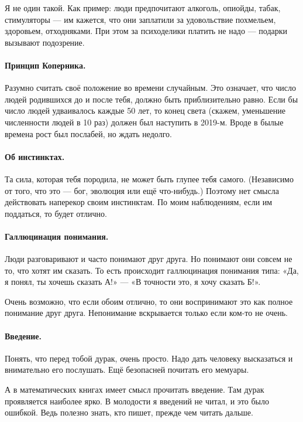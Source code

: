 \documentclass{book}
\begin{document}
Я не один такой.
Как пример: люди предпочитают алкоголь, опиойды, табак, стимуляторы --- им кажется, что они заплатили за удовольствие похмельем, здоровьем, отходняками.
При этом за психоделики платить не надо --- подарки вызывают подозрение.

\paragraph{Принцип Коперника.}
Разумно считать своё положение во времени случайным.
Это означает, что число людей родившихся до и после тебя, должно быть приблизительно равно.
Если бы число людей удваивалось каждые 50 лет, то конец света (скажем, уменьшение численности людей в 10 раз) должен был наступить в 2019-м.
Вроде в былые времена рост был послабей, но ждать недолго.

\paragraph{Об инстинктах.}
Та сила, которая тебя породила, не может быть глупее тебя самого.
(Независимо от того, что это --- бог, эволюция или ещё что-нибудь.)
Поэтому нет смысла действовать наперекор своим инстинктам.
По моим наблюдениям, если им поддаться, то будет отлично. 

\paragraph{Галлюцинация понимания.}
Люди разговаривают и часто понимают друг друга.
Но понимают они совсем не то, что хотят им сказать.
То есть происходит галлюцинация понимания типа: «Да, я понял, ты хочешь сказать А!» --- «В точности это, я хочу сказать Б!».

Очень возможно, что если обоим отлично, то они воспринимают это как полное понимание друг друга.
Непонимание вскрывается только если ком-то не очень.

\paragraph{Введение.}
Понять, что перед тобой дурак, очень просто.
Надо дать человеку высказаться и внимательно его послушать.
Ещё безопасней почитать его мемуары.

А в математических книгах имеет смысл прочитать введение.
Там дурак проявляется наиболее ярко.
В молодости я введений не читал, и это было ошибкой. 
Ведь полезно знать, кто пишет, прежде чем читать дальше.
\end{document}
